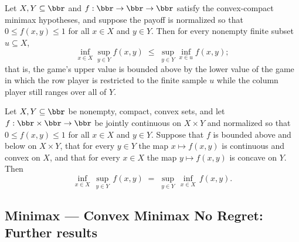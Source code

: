 \begin{theorem}
\label{OnlineLearning.theorem71_finiteNoRegretBound_normalized}
\leanok
{}
Let $X, Y \subseteq \bbr$ and $f : \bbr \to \bbr \to \bbr$ satisfy the convex-compact
minimax hypotheses, and suppose the payoff is normalized so that $0 \le f(x,y) \le 1$
for all $x \in X$ and $y \in Y$. Then for every nonempty finite subset $u \subseteq X$,
\[
  \inf_{x \in X} \sup_{y \in Y} f(x,y)
    \;\le\;
  \sup_{y \in Y} \inf_{x \in u} f(x,y);
\]
that is, the game's upper value is bounded above by the lower value of the game in which
the row player is restricted to the finite sample $u$ while the column player still
ranges over all of $Y$.
\end{theorem}

\begin{theorem}
\label{OnlineLearning.convex_compact_minimax_noRegret_jointCompact_normalized}
\leanok
{}
Let $X, Y \subseteq \bbr$ be nonempty, compact, convex sets, and let $f : \bbr \times
\bbr \to \bbr$ be jointly continuous on $X \times Y$ and normalized so that $0 \le
f(x,y) \le 1$ for all $x \in X$ and $y \in Y$. Suppose that $f$ is bounded above and
below on $X \times Y$, that for every $y \in Y$ the map $x \mapsto f(x,y)$ is continuous
and convex on $X$, and that for every $x \in X$ the map $y \mapsto f(x,y)$ is concave on
$Y$. Then
\[
  \inf_{x \in X}\,\sup_{y \in Y}\,f(x,y)
  \;=\;
  \sup_{y \in Y}\,\inf_{x \in X}\,f(x,y).
\]
\end{theorem}

\subsection*{Minimax --- Convex Minimax No Regret: Further results}

